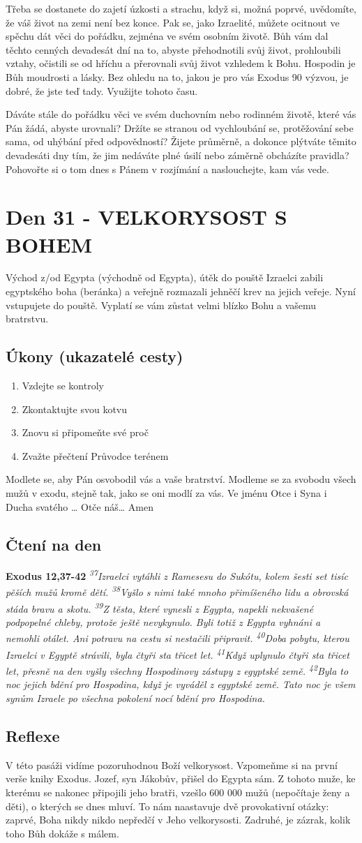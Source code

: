 \documentclass[11pt]{article}
\newcommand{\zacatekPatyTyden}{
  Východ z/od Egypta (východně od Egypta), útěk do pouště \newline
  Izraelci zabili egyptského boha (beránka) a veřejně rozmazali jehněčí krev na jejich veřeje. Nyní vstupujete
  do pouště. Vyplatí se vám zůstat velmi blízko Bohu a vašemu bratrstvu.

\subsection*{Úkony (ukazatelé cesty)}
\begin{enumerate}
  \item Vzdejte se kontroly
  \item Zkontaktujte svou kotvu
  \item Znovu si připomeňte své proč
  \item Zvažte přečtení Průvodce terénem
\end{enumerate}
Modlete se, aby Pán osvobodil vás a vaše bratrství. \newline
Modleme se za svobodu všech mužů v exodu, stejně tak, jako se oni modlí za vás.\newline
Ve jménu Otce i Syna i Ducha svatého …  Otče náš… Amen
}
\begin{document}
Třeba se dostanete do zajetí úzkosti a strachu, když si, možná poprvé, uvědomíte, že váš život na zemi není bez konce.
Pak se, jako Izraelité, můžete ocitnout ve spěchu dát věci do pořádku, zejména ve svém osobním životě. Bůh vám dal
těchto cenných devadesát dní na to, abyste přehodnotili svůj život, prohloubili vztahy, očistili se od hříchu a přerovnali
svůj život vzhledem k Bohu. Hospodin je Bůh moudrosti a lásky. Bez ohledu na to, jakou je pro vás Exodus 90
výzvou, je dobré, že jste teď tady. Využijte tohoto času.

Dáváte stále do pořádku věci ve svém duchovním nebo rodinném životě, které vás Pán žádá, abyste urovnali? Držíte se
stranou od vychloubání se, protěžování sebe sama, od uhýbání před odpovědností? Žijete průměrně, a dokonce plýtváte
těmito devadesáti dny tím, že jim nedáváte plné úsilí nebo záměrně obcházíte pravidla? Pohovořte si o tom dnes
s Pánem v rozjímání a naslouchejte, kam vás vede.


\newpage
\section{Den 31 - VELKORYSOST S BOHEM}
\zacatekPatyTyden
\subsection*{Čtení na den}
\textbf{Exodus 12,37-42}
\newline
\textit{
\textsuperscript{37}Izraelci vytáhli z Ramesesu do Sukótu, kolem šesti set tisíc pěších mužů kromě dětí.
\textsuperscript{38}Vyšlo s nimi také mnoho přimíšeného lidu a obrovská stáda bravu a skotu.
\textsuperscript{39}Z těsta, které vynesli z Egypta, napekli nekvašené podpopelné chleby, protože ještě nevykynulo. Byli totiž z Egypta vyhnáni a nemohli otálet. Ani potravu na cestu si nestačili připravit.
\textsuperscript{40}Doba pobytu, kterou Izraelci v Egyptě strávili, byla čtyři sta třicet let.
\textsuperscript{41}Když uplynulo čtyři sta třicet let, přesně na den vyšly všechny Hospodinovy zástupy z egyptské země.
\textsuperscript{42}Byla to noc jejich bdění pro Hospodina, když je vyváděl z egyptské země. Tato noc je všem synům Izraele po všechna pokolení nocí bdění pro Hospodina.
}

\subsection*{Reflexe}
V této pasáži vidíme pozoruhodnou Boží velkorysost. Vzpomeňme si na první verše knihy Exodus. Jozef, syn Jákobův,
přišel do Egypta sám. Z tohoto muže, ke kterému se nakonec připojili jeho bratři, vzešlo 600 000 mužů (nepočítaje
ženy a děti), o kterých se dnes mluví. To nám naastavuje dvě provokativní otázky: zaprvé, Boha nikdy nikdo nepředčí
v Jeho velkorysosti. Zadruhé, je zázrak, kolik toho Bůh dokáže s málem.
\end{document}
